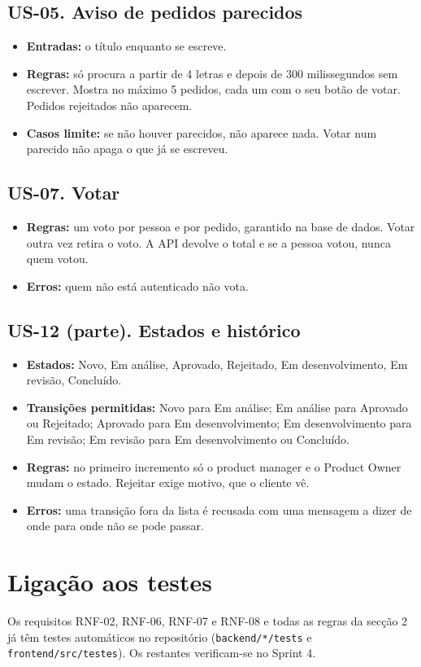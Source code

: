 \documentclass[11pt,a4paper]{article}
\begin{document}
\subsection{US-05. Aviso de pedidos parecidos}

\begin{itemize}
\item \textbf{Entradas:} o título enquanto se escreve.
\item \textbf{Regras:} só procura a partir de 4 letras e depois de 300 milissegundos sem escrever. Mostra no máximo 5 pedidos, cada um com o seu botão de votar. Pedidos rejeitados não aparecem.
\item \textbf{Casos limite:} se não houver parecidos, não aparece nada. Votar num parecido não apaga o que já se escreveu.
\end{itemize}

\subsection{US-07. Votar}

\begin{itemize}
\item \textbf{Regras:} um voto por pessoa e por pedido, garantido na base de dados. Votar outra vez retira o voto. A API devolve o total e se a pessoa votou, nunca quem votou.
\item \textbf{Erros:} quem não está autenticado não vota.
\end{itemize}

\subsection{US-12 (parte). Estados e histórico}

\begin{itemize}
\item \textbf{Estados:} Novo, Em análise, Aprovado, Rejeitado, Em desenvolvimento, Em revisão, Concluído.
\item \textbf{Transições permitidas:} Novo para Em análise; Em análise para Aprovado ou Rejeitado; Aprovado para Em desenvolvimento; Em desenvolvimento para Em revisão; Em revisão para Em desenvolvimento ou Concluído.
\item \textbf{Regras:} no primeiro incremento só o product manager e o Product Owner mudam o estado. Rejeitar exige motivo, que o cliente vê.
\item \textbf{Erros:} uma transição fora da lista é recusada com uma mensagem a dizer de onde para onde não se pode passar.
\end{itemize}

\section{Ligação aos testes}

Os requisitos RNF-02, RNF-06, RNF-07 e RNF-08 e todas as regras da secção 2 já têm testes automáticos no repositório (\texttt{backend/*/tests} e \texttt{frontend/src/testes}). Os restantes verificam-se no Sprint 4.
\end{document}
